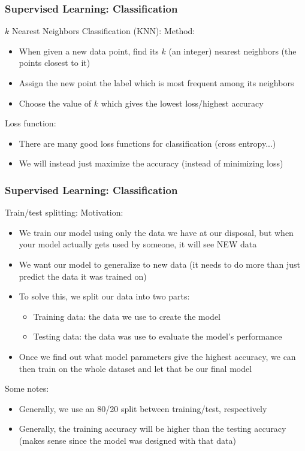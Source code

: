 \documentclass{beamer}
\begin{document}
\begin{frame}
	\frametitle{Supervised Learning: Classification}
	
	\begin{block}{$k$ Nearest Neighbors Classification (KNN):}
		\footnotesize
		Method:
		\begin{itemize}
			\item When given a new data point, find its $k$ (an integer) nearest neighbors (the points closest to it)
			\item Assign the new point the label which is most frequent among its neighbors
			\item Choose the value of $k$ which gives the lowest loss/highest accuracy 
		\end{itemize}
		Loss function:
		\begin{itemize}
			\item There are many good loss functions for classification (cross entropy...)
			\item We will instead just maximize the accuracy (instead of minimizing loss)
		\end{itemize}
	\end{block}

\end{frame}

\begin{frame}
	\frametitle{Supervised Learning: Classification}
	
	\begin{block}{Train/test splitting:}
		\footnotesize
		Motivation:
		\begin{itemize}
			\item We train our model using only the data we have at our disposal, but when your model actually gets used by someone, it will see NEW data
			\item We want our model to generalize to new data (it needs to do more than just predict the data it was trained on)
			\item To solve this, we split our data into two parts:
			\begin{itemize}
				\item Training data: the data we use to create the model
				\item Testing data: the data was use to evaluate the model's performance
			\end{itemize}
			\item Once we find out what model parameters give the highest accuracy, we can then train on the whole dataset and let that be our final model
		\end{itemize}
		Some notes:
		\begin{itemize}
			\item Generally, we use an 80/20 split between training/test, respectively
			\item Generally, the training accuracy will be higher than the testing accuracy (makes sense since the model was designed with that data)
		\end{itemize}
	\end{block}

\end{frame}
\end{document}

